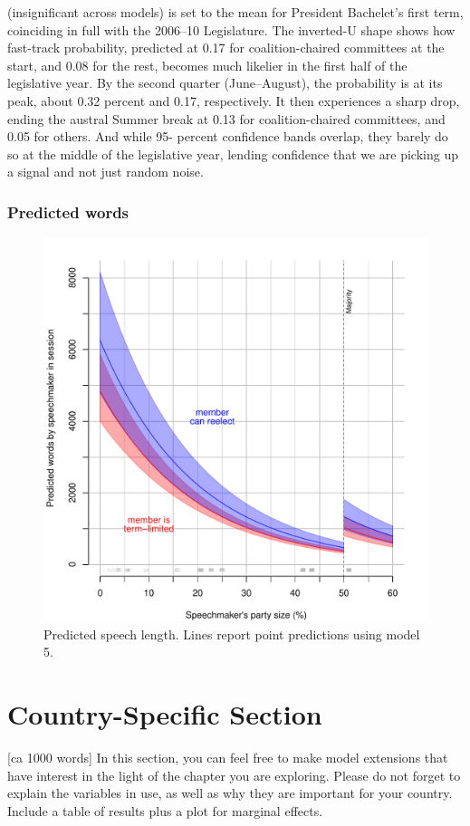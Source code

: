 \documentclass[letter,12pt]{article}
\begin{document}
(insignificant across models) is set to the mean for President Bachelet’s first term, coinciding in full
with the 2006–10 Legislature. The inverted-U shape shows how fast-track probability, predicted
at 0.17 for coalition-chaired committees at the start, and 0.08 for the rest, becomes much likelier
in the first half of the legislative year. By the second quarter (June–August), the probability is at
its peak, about 0.32 percent and 0.17, respectively. It then experiences a sharp drop, ending the
austral Summer break at 0.13 for coalition-chaired committees, and 0.05 for others. And while 95-
percent confidence bands overlap, they barely do so at the middle of the legislative year, lending
confidence that we are picking up a signal and not just random noise.

    \subsubsection{Predicted words}

\begin{figure}
  \centering
    \includegraphics[width=.8\columnwidth]{../plots/predictedWords.pdf}
    \caption{Predicted speech length. Lines report point predictions using model 5.}\label{F:predict}
\end{figure}


  
\section{Country-Specific Section} [ca 1000 words]
In this section, you can feel free to make model extensions that have interest in the light of the chapter you are exploring. Please do not forget to explain the variables in use, as well as why they are important for your country. Include a table of results plus a plot for marginal effects. 
\end{document}
